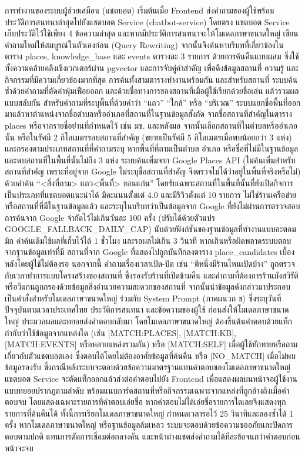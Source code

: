 การทำงานของระบบผู้ช่วยเสมือน (แชตบอต) เริ่มต้นเมื่อ Frontend ส่งคำถามของผู้ใช้พร้อมประวัติการสนทนาล่าสุดไปยังแชตบอต Service (chatbot-service) โดยตรง แชตบอต Service เก็บประวัติไว้ใช้เพียง 4 ข้อความล่าสุด และหากมีประวัติการสนทนาจะให้โมเดลภาษาขนาดใหญ่ เขียนคำถามใหม่ให้สมบูรณ์ในตัวเองก่อน (Query Rewriting) จากนั้นจึงค้นหาบริบทที่เกี่ยวข้องในตาราง places, knowledge\_base และ events ตารางละ 3 รายการ ด้วยการค้นคืนแบบผสม ซึ่งใช้ทั้งความคล้ายคลึงเชิงเวกเตอร์ผ่าน pgvector และการจับคู่คำสำคัญ เพื่อดึงข้อมูลสถานที่ ความรู้ และกิจกรรมที่มีความเกี่ยวข้องมากที่สุด การค้นทั้งสามตารางทำงานพร้อมกัน และสำหรับสถานที่ ระบบค้นซ้ำด้วยคำถามที่ตัดคำฟุ่มเฟือยออก และด้วยชื่อทางการของสถานที่เมื่อผู้ใช้เรียกด้วยชื่อเล่น แล้วรวมผลแบบสลับกัน สำหรับคำถามที่ระบุพื้นที่ด้วยคำว่า ``แถว'' ``ใกล้'' หรือ ``บริเวณ'' ระบบแยกชื่อพื้นที่ออกมาแล้วหาตำแหน่งจากชื่อตำบลหรืออำเภอที่สถานที่ในฐานข้อมูลสังกัด จากชื่อสถานที่สำคัญในตาราง places หรือจากรายชื่อย่านที่กำหนดไว้ เช่น มข. และหลังมอ จากนั้นเลือกสถานที่ในตำบลหรืออำเภอนั้น หรือในรัศมี 2 กิโลเมตรรอบสถานที่สำคัญ (ขยายเป็นรัศมี 5 กิโลเมตรเมื่อพบน้อยกว่า 3 แห่ง) และกรองตามประเภทสถานที่ที่คำถามระบุ หากพื้นที่ที่ถามเป็นตำบล อำเภอ หรือชื่อที่ไม่มีในฐานข้อมูล และพบสถานที่ในพื้นที่นั้นไม่ถึง 3 แห่ง ระบบค้นเพิ่มจาก Google Places API (ไม่ค้นเพิ่มสำหรับสถานที่สำคัญ เพราะที่อยู่จาก Google ไม่ระบุชื่อสถานที่สำคัญ จึงตรวจไม่ได้ว่าอยู่ในพื้นที่จริงหรือไม่) ด้วยคำค้น ``<สิ่งที่ถาม> แถว<พื้นที่> ขอนแก่น'' โดยรับเฉพาะสถานที่ในพื้นที่นั้นที่ยังเปิดกิจการ เป็นประเภทที่แชตบอตแนะนำได้ มีคะแนนตั้งแต่ 4.0 และมีรีวิวตั้งแต่ 10 รายการ ไม่ใช่ร้านเครือข่ายหรือสถานที่ที่มีในฐานข้อมูลแล้ว และระบุในบริบทว่าเป็นข้อมูลจาก Google ที่ยังไม่ผ่านการตรวจสอบ การค้นจาก Google จำกัดไว้ไม่เกินวันละ 100 ครั้ง (ปรับได้ด้วยตัวแปร GOOGLE\_FALLBACK\_DAILY\_CAP) นับด้วยฟังก์ชันของฐานข้อมูลที่ทำงานแบบอะตอมมิก คำค้นเดิมใช้ผลที่เก็บไว้ได้ 1 ชั่วโมง และรอผลไม่เกิน 3 วินาที หากเกินหรือผิดพลาดระบบตอบจากฐานข้อมูลเท่าที่มี สถานที่จาก Google ที่แสดงไปถูกบันทึกลงตาราง place\_candidates เบื้องหลังโดยผู้ใช้ไม่ต้องรอ นอกจากนี้ คำถามเรื่องเวลาเปิด-ปิด เช่น ``ตีหนึ่งมีร้านไหนเปิดบ้าง'' ถูกตรวจกับเวลาทำการแบบโครงสร้างของสถานที่ ซึ่งรองรับร้านที่เปิดข้ามคืน และคำถามที่ต้องการร้านมังสวิรัติหรือวีแกนถูกกรองด้วยข้อมูลสิ่งอำนวยความสะดวกของสถานที่ จากนั้นนำข้อมูลดังกล่าวมาประกอบเป็นคำสั่งสำหรับโมเดลภาษาขนาดใหญ่ ร่วมกับ System Prompt (ภาคผนวก ข) ซึ่งระบุวันที่ปัจจุบันตามเวลาประเทศไทย ประวัติการสนทนา และข้อความของผู้ใช้ ก่อนส่งให้โมเดลภาษาขนาดใหญ่ ประมวลผลและทยอยส่งคำตอบกลับมา โดยโมเดลภาษาขนาดใหญ่ ต้องขึ้นต้นคำตอบด้วยแท็กกำกับว่าใช้ข้อมูลจากแหล่งใด (เช่น [MATCH:PLACES], [MATCH:KB], [MATCH:EVENTS] หรือหลายแหล่งรวมกัน) หรือ [MATCH:SELF] เมื่อผู้ใช้ทักทายหรือถามเกี่ยวกับตัวแชตบอตเอง ซึ่งตอบได้โดยไม่ต้องอาศัยข้อมูลที่ค้นคืน หรือ [NO\_MATCH] เมื่อไม่พบข้อมูลรองรับ ซึ่งกรณีหลังระบบจะตอบด้วยข้อความมาตรฐานแทนคำตอบของโมเดลภาษาขนาดใหญ่ แชตบอต Service จะตัดแท็กออกแล้วส่งต่อคำตอบไปยัง Frontend เพื่อแสดงผลบนหน้าจอผู้ใช้งานแบบทยอยปรากฏตามลำดับ พร้อมแนบการ์ดสถานที่หรือกิจกรรมเฉพาะจากแหล่งที่ถูกอ้างถึงเมื่อคำตอบจบ โดยแสดงเฉพาะรายการที่คำตอบเอ่ยชื่อ หากคำตอบไม่ได้เอ่ยชื่อรายการใดเลยจึงแสดงทุกรายการที่ค้นคืนได้ ทั้งนี้การเรียกโมเดลภาษาขนาดใหญ่ กำหนดเวลารอไว้ 25 วินาทีและลองซ้ำได้ 1 ครั้ง หากโมเดลภาษาขนาดใหญ่ หรือฐานข้อมูลล้มเหลว ระบบจะตอบด้วยข้อความขออภัยและปิดการตอบตามปกติ แทนการตัดการเชื่อมต่อกลางคัน และหน้าต่างแชตส่งคำถามได้ทีละข้อจนกว่าคำตอบก่อนหน้าจะจบ

